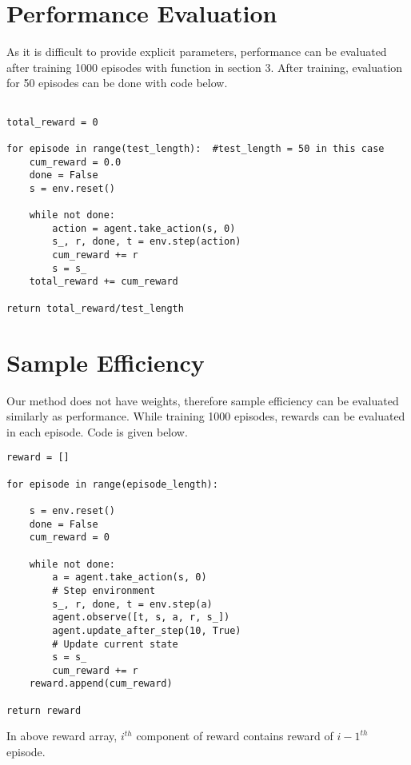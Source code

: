 \documentclass{article}
\begin{document}
\section{Performance Evaluation}

As it is difficult to provide explicit parameters, performance can be evaluated after training 1000 episodes with function in section 3. After training, evaluation for 50 episodes can be done with code below.

\begin{lstlisting}

total_reward = 0

for episode in range(test_length):  #test_length = 50 in this case
    cum_reward = 0.0
    done = False
    s = env.reset()
    
    while not done: 
        action = agent.take_action(s, 0)
        s_, r, done, t = env.step(action)
        cum_reward += r
        s = s_
    total_reward += cum_reward
        
return total_reward/test_length
\end{lstlisting}

\section{Sample Efficiency}

Our method does not have weights, therefore sample efficiency can be evaluated similarly as performance. While training 1000 episodes, rewards can be evaluated in each episode. Code is given below. 

\begin{lstlisting}
reward = []

for episode in range(episode_length):
    
    s = env.reset()
    done = False
    cum_reward = 0
    
    while not done:
        a = agent.take_action(s, 0)
        # Step environment
        s_, r, done, t = env.step(a)
        agent.observe([t, s, a, r, s_])
        agent.update_after_step(10, True)
        # Update current state
        s = s_
        cum_reward += r
    reward.append(cum_reward)

return reward
\end{lstlisting}
\noindent
In above reward array, $i^{th}$ component of reward contains reward of $i-1^{th}$ episode. 


\nocite{*}
\end{document}
